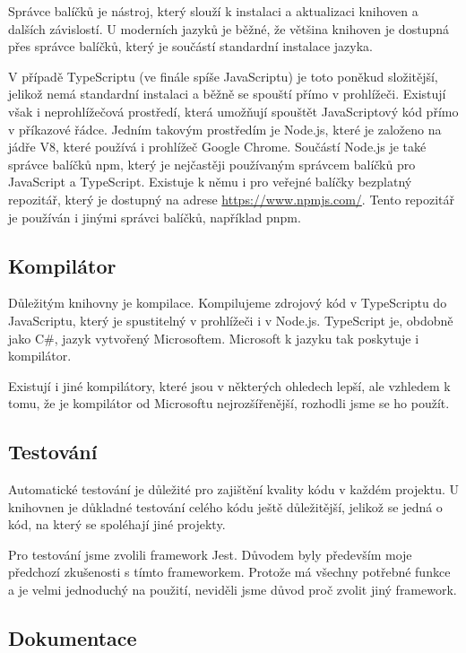 Správce balíčků je nástroj, který slouží k instalaci a aktualizaci knihoven a dalších závislostí. 
U moderních jazyků je běžné, že většina knihoven je dostupná přes správce balíčků, který je součástí standardní instalace jazyka.

V případě TypeScriptu (ve finále spíše JavaScriptu) je toto poněkud složitější, jelikož nemá standardní instalaci a běžně se spouští přímo v prohlížeči.
Existují však i neprohlížečová prostředí, která umožňují spouštět JavaScriptový kód přímo v příkazové řádce. 
Jedním takovým prostředím je Node.js, které je založeno na jádře V8, které používá i prohlížeč Google Chrome.
Součástí Node.js je také správce balíčků npm, který je nejčastěji používaným správcem balíčků pro JavaScript a TypeScript. 
Existuje k němu i pro veřejné balíčky bezplatný repozitář, který je dostupný na adrese \url{https://www.npmjs.com/}.
Tento repozitář je používán i jinými správci balíčků, například pnpm.

\subsection{Kompilátor}

Důležitým  knihovny je kompilace. 
Kompilujeme zdrojový kód v TypeScriptu do JavaScriptu, který je spustitelný v prohlížeči i v Node.js. 
TypeScript je, obdobně jako C\#, jazyk vytvořený Microsoftem.
Microsoft k jazyku tak poskytuje i kompilátor.

Existují i jiné kompilátory, které jsou v některých ohledech lepší, ale vzhledem k tomu, že je kompilátor od Microsoftu nejrozšířenější, rozhodli jsme se ho použít.

\subsection{Testování}

Automatické testování je důležité pro zajištění kvality kódu v každém projektu. 
U knihovnen je důkladné testování celého kódu ještě důležitější, jelikož se jedná o kód, na který se spoléhají jiné projekty.

Pro testování jsme zvolili framework Jest.
Důvodem byly především moje předchozí zkušenosti s tímto frameworkem.
Protože má všechny potřebné funkce a je velmi jednoduchý na použití, neviděli jsme důvod proč zvolit jiný framework.

\subsection{Dokumentace}

